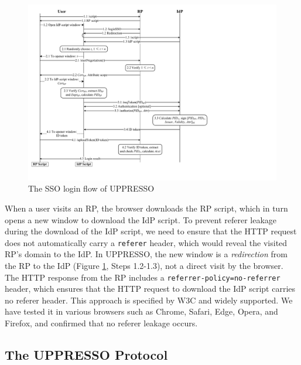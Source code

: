 \begin{figure}[htb]
  \centering
  \includegraphics[height=0.575\textheight]{fig/process-js.pdf}
  \caption{The SSO login flow of UPPRESSO}
  \label{fig:process}
\end{figure}

When a user visits an RP, the browser downloads the RP script, which in turn opens a new window to download the IdP script. To prevent referer leakage during the download of the IdP script, we need to ensure that the HTTP request does not automatically carry a \verb+referer+ header, which would reveal the visited RP's domain to the IdP. %
In UPPRESSO, the new window is a \emph{redirection} from the RP to the IdP (Figure \ref{fig:process}, Steps 1.2-1.3), not a direct visit by the browser. The HTTP response from the RP includes a \verb+referrer-policy=no-referrer+ header, which ensures that the HTTP request to download the IdP script carries no referer header. This approach is specified by W3C \cite{referer_policy} and widely supported. We have tested it in various browsers such as Chrome, Safari, Edge, Opera, and Firefox, and confirmed that no referer leakage occurs.




\subsection{The UPPRESSO Protocol}
\label{implementations}

